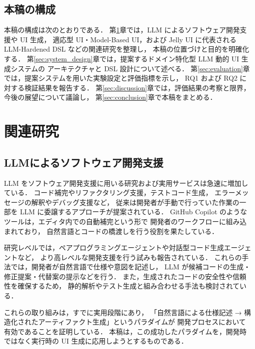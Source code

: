 \documentclass[a4paper,10pt]{jarticle}
\begin{document}
\subsection{本稿の構成}

本稿の構成は次のとおりである．
第\ref{sec:related_work}章では，LLM によるソフトウェア開発支援や UI 生成，
適応型 UI・Model-Based UI，および Jelly UI に代表される LLM-Hardened DSL などの関連研究を整理し，
本稿の位置づけと目的を明確化する．
第\ref{sec:system_design}章では，提案するドメイン特化型 LLM 動的 UI 生成システムの
アーキテクチャと DSL 設計について述べる．
第\ref{sec:evaluation}章では，提案システムを用いた実験設定と評価指標を示し，
RQ1 および RQ2 に対する検証結果を報告する．
第\ref{sec:discussion}章では，評価結果の考察と限界，今後の展望について議論し，
第\ref{sec:conclusion}章で本稿をまとめる．



\section{関連研究}
\label{sec:related_work}

\subsection{LLMによるソフトウェア開発支援}

LLM をソフトウェア開発支援に用いる研究および実用サービスは急速に増加している．
コード補完やリファクタリング支援，テストコード生成，
エラーメッセージの解釈やデバッグ支援など，
従来は開発者が手動で行っていた作業の一部を LLM に委譲するアプローチが提案されている．
GitHub Copilot のようなツールは，エディタ内での自動補完という形で
開発者のワークフローに組み込まれており，
自然言語とコードの橋渡しを行う役割を果たしている\cite{uiuc2025copilot}．

研究レベルでは，ペアプログラミングエージェントや対話型コード生成エージェントなど，
より高レベルな開発支援を行う試みも報告されている．
これらの手法では，開発者が自然言語で仕様や意図を記述し，
LLM が候補コードの生成・修正提案・代替案の提示などを行う．
また，生成されたコードの安全性や信頼性を確保するため，
静的解析やテスト生成と組み合わせる手法も検討されている\cite{cognition2025devin}．


これらの取り組みは，すでに実用段階にあり，
「自然言語による仕様記述 → 構造化されたアーティファクト生成」というパラダイムが
開発プロセスにおいて有効であることを証明している．
本稿は，この成功したパラダイムを，開発時ではなく実行時の UI 生成に応用しようとするものである．
\end{document}
